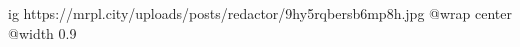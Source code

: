  
 
 
 
 

\ifcmt
  ig https://mrpl.city/uploads/posts/redactor/9hy5rqbersb6mp8h.jpg
  @wrap center
  @width 0.9
\fi
